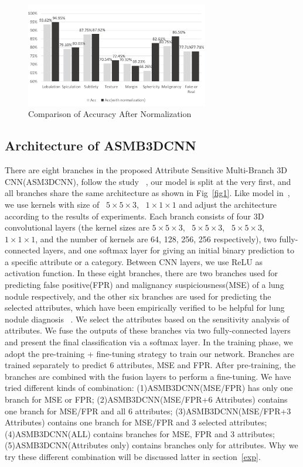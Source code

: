 \documentclass[runningheads]{llncs}
\begin{document}
\begin{figure}[htb]
\centerline{\includegraphics[width=80mm]{fig2.pdf}}
\vspace{-0.5cm}
\caption{Comparison of Accuracy After Normalization}
\vspace{-0.5cm}
\label{normalization}
\end{figure}


\subsection{Architecture of ASMB3DCNN}
\label{architecture}
There are eight branches in the proposed Attribute Sensitive Multi-Branch 3D CNN(ASM3DCNN), follow the study ~\cite{nanwu2019dnn}, our model is split at the very first, and all branches share the same architecture as shown in Fig~\ref{fig1}.
Like model in~\cite{Qi2016Multilevel}, we use kernels with size of  ~$5\times5\times3$, ~$1\times1\times1$ and adjust the architecture according to the results of experiments. Each branch consists of four 3D convolutional layers (the kernel sizes are $5\times5\times3$, ~$5\times5\times3$, ~$5\times5\times3$, ~$1\times1\times1$, and the number of kernels are 64, 128, 256, 256 respectively), two fully-connected layers, and one softmax layer for giving an initial binary prediction to a specific attribute or a category. Between CNN layers, we use ReLU as activation function. In these eight branches, there are two branches used for predicting false positive(FPR) and malignancy suspiciousness(MSE) of a lung nodule respectively, and the other six branches are used for predicting the selected attributes, which have been empirically verified to be helpful for lung nodule diagnosis~ \cite{Hussein2017Risk}. 
We select the attributes based on the sensitivity analysis of attributes. We fuse the outputs of these branches via two fully-connected layers and present the final classification via a softmax layer. In the training phase, we adopt the pre-training + fine-tuning strategy to train our network. Branches are trained separately to predict 6 attributes, MSE and FPR. After pre-training, the branches are combined with the fusion layers to perform a fine-tuning. We have tried different kinds of combination: (1)ASMB3DCNN(MSE/FPR) has only one branch for MSE or FPR; (2)ASMB3DCNN(MSE/FPR+6 Attributes) contains one branch for MSE/FPR and all 6 attributes; (3)ASMB3DCNN(MSE/FPR+3 Attributes) contains one branch for MSE/FPR and 3 selected attributes; (4)ASMB3DCNN(ALL) contains branches for MSE, FPR and 3 attributes; (5)ASMB3DCNN(Attributes only) contains branches only for attributes. Why we try these different combination will be discussed latter in section~\ref{exp}.
\end{document}
